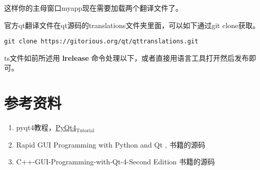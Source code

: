 \documentclass[11pt,oneside]{article}
\begin{document}
这样你的主母窗口myapp现在需要加载两个翻译文件了。

官方qt翻译文件在qt源码的translations文件夹里面，可以如下通过git clone获取。
\begin{verbatim}
git clone https://gitorious.org/qt/qttranslations.git
\end{verbatim}

ts文件如前所述用 \textbf{lrelease} 命令处理以下，或者直接用语言工具打开然后发布即可。



\section{参考资料}
\label{sec:orgheadline47}
\begin{enumerate}
\item pyqt4教程，\href{http://blog.cx125.com/books/PyQt4_Tutorial/}{PyQt4\(_{\text{Tutorial}}\)}

\item Rapid GUI Programming with Python and Qt , 书籍的源码

\item C++-GUI-Programming-with-Qt-4-Second Edition 书籍的源码
\end{enumerate}
\end{document}
